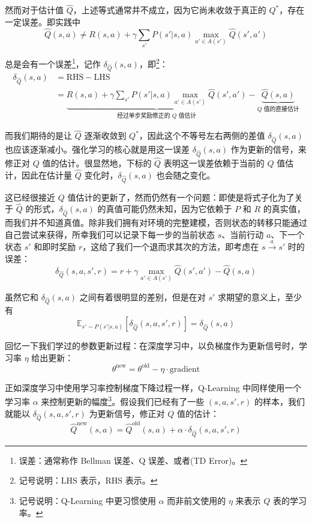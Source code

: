 然而对于估计值 $\hat Q$，上述等式通常并不成立，因为它尚未收敛于真正的 $Q^*$，存在一定误差。即实践中
\[
    \hat Q (s, a) \ne R(s, a) + \gamma \sum_{s'} P(s' | s, a) \max_{a' \in A(s')} \hat Q (s', a')
\]

总是会有一个误差\footnote{误差：通常称作 Bellman 误差、Q 误差、或者(TD Error)。}，记作 $\delta_{\hat Q} (s, a)$，即\footnote{记号说明：$\text{LHS}$ 表示，$\text{RHS}$ 表示。}：
\[
\begin{aligned}
    \delta_{\hat Q} (s, a) &= \text{RHS} - \text{LHS} \\
    &= \underset{\text{经过单步奖励修正的 $Q$ 值估计}}{\underbrace{R(s, a) + \gamma \sum_{s'} P(s' | s, a) \max_{a' \in A(s')} \hat Q (s', a')}} - \underset{\text{$Q$ 值的直接估计}}{\underbrace{\hat Q (s, a)}}
\end{aligned}
\]

而我们期待的是让 $\hat Q$ 逐渐收敛到 $Q^*$，因此这个不等号左右两侧的差值 $\delta_{\hat Q} (s, a)$ 也应该逐渐减小。强化学习的核心就是用这一误差 $\delta_{\hat Q} (s, a)$ 作为更新的信号，来修正对 $Q$ 值的估计。很显然地，下标的 $\hat Q$ 表明这一误差依赖于当前的 $Q$ 值估计，因此在估计量 $\hat Q$ 变化时，$\delta_{\hat Q} (s, a)$ 也会随之变化。

这已经很接近 $Q$ 值估计的更新了，然而仍然有一个问题：即使是将式子化为了关于 $\hat Q$ 的形式，$\delta_{\hat Q} (s, a)$ 的真值可能仍然未知，因为它依赖于 $P$ 和 $R$ 的真实值，而我们并不知道真值。除非我们拥有对环境的完整建模，否则状态的转移只能通过自己尝试来获得，所幸我们可以记录下每一步的当前状态 $s$、当前行动 $a$、下一个状态 $s'$ 和即时奖励 $r$，这给了我们一个退而求其次的方法，即考虑在 $s \overset{a}{\to} s'$ 时的误差：
\[
    \delta_{\hat Q} (s, a, s', r) = r + \gamma \max_{a' \in A(s')} \hat Q (s', a') - \hat Q (s, a)
\]

虽然它和 $\delta_{\hat Q} (s, a)$ 之间有着很明显的差别，但是在对 $s'$ 求期望的意义上，至少有
\[
    \mathbb{E}_{s' \sim P(s' | s, a)}[\delta_{\hat Q} (s, a, s', r)] = \delta_{\hat Q} (s, a)
\]

回忆一下我们学过的参数更新过程：在深度学习中，以负梯度作为更新信号时，学习率 $\eta$ 给出更新：
\[
    \theta^{\text{new}} = \theta^{\text{old}} - \eta \cdot \text{gradient}
\]

正如深度学习中使用学习率控制梯度下降过程一样，Q-Learning 中同样使用一个学习率 $\alpha$ 来控制更新的幅度\footnote{记号说明：Q-Learning 中更习惯使用 $\alpha$ 而非前文使用的 $\eta$ 来表示 $Q$ 表的学习率。}。假设我们已经有了一些 $(s, a, s', r)$ 的样本，我们就能以 $\delta_{\hat Q} (s, a, s', r)$ 为更新信号，修正对 $Q$ 值的估计：
\[
    \hat Q^{\text{new}} (s, a) = \hat Q^{\text{old}} (s, a) + \alpha \cdot \delta_{\hat Q} (s, a, s', r)
\]

